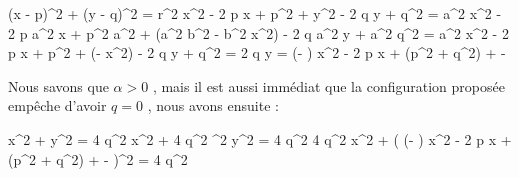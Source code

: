 \begin{stepcalc}[style=ar*, ope=\implies]
	(x - p)^2 + (y - q)^2 = r^2
	x^2 - 2 p x + p^2 + y^2 - 2 q y + q^2 = \rho
%
{}
	a^2 x^2 - 2 p a^2 x + p^2 a^2 + (a^2 b^2 - b^2 x^2) - 2 q a^2 y + a^2 q^2 = a^2 \rho
{}
	\alpha x^2 - 2 p \alpha x + p^2 \alpha + (\gamma - \beta x^2) - 2 q \alpha y + \alpha q^2 = \alpha \rho
\explnext{}
      2 q \alpha y
    =
	  (\alpha - \beta) x^2 
	- 2 p \alpha x 
	+ \alpha(p^2 + q^2) 
	+ \gamma - \alpha \rho
\end{stepcalc}


\bigskip


Nous savons que $\alpha > 0$ , mais il est aussi immédiat que la configuration proposée empêche d'avoir $q = 0$ , nous avons ensuite :

\medskip

\begin{stepcalc}[style=ar*, ope=\implies]
	\beta x^2 + \alpha y^2 = \gamma
\explnext{}
    4 q^2 \alpha \beta x^2 + 4 q^2 \alpha^2 y^2 = 4 q^2 \alpha \gamma
\explnext{}
    4 q^2 \alpha \beta x^2 
    + 
    \big(
    	(\alpha - \beta) x^2 
	- 2 p \alpha x 
	+ \alpha(p^2 + q^2) 
	+ \gamma - \alpha \rho
    \big)^2
    =
    4 q^2 \alpha \gamma
\end{stepcalc}

